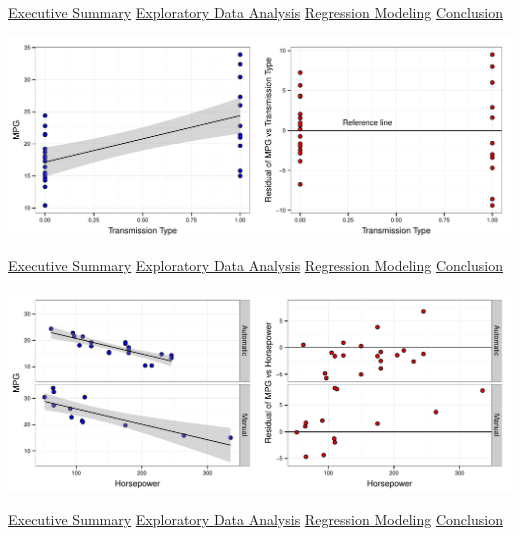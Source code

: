 \documentclass[10pt,]{article}
\begin{document}
\hyperref[eo]{Executive Summary} \textbar{} \hyperref[eda]{Exploratory
Data Analysis} \textbar{} \hyperref[rm]{Regression Modeling} \textbar{}
\hyperref[conclusion]{Conclusion}


\includegraphics{RegressionModelsProj_3_files/figure-latex/unnamed-chunk-10-1.pdf}

\hyperref[eo]{Executive Summary} \textbar{} \hyperref[eda]{Exploratory
Data Analysis} \textbar{} \hyperref[rm]{Regression Modeling} \textbar{}
\hyperref[conclusion]{Conclusion}


\includegraphics{RegressionModelsProj_3_files/figure-latex/unnamed-chunk-11-1.pdf}

\hyperref[eo]{Executive Summary} \textbar{} \hyperref[eda]{Exploratory
Data Analysis} \textbar{} \hyperref[rm]{Regression Modeling} \textbar{}
\hyperref[conclusion]{Conclusion}
\end{document}
